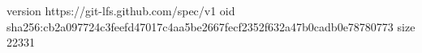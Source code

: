 version https://git-lfs.github.com/spec/v1
oid sha256:cb2a097724c3feefd47017c4aa5be2667fecf2352f632a47b0cadb0e78780773
size 22331
